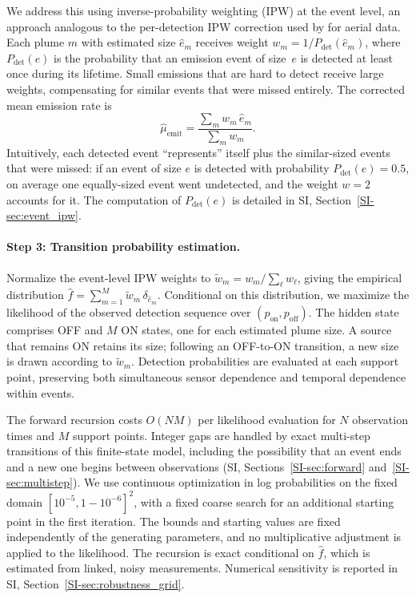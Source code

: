 \documentclass[numsec,webpdf,modern,mediumone]{oup-authoring-template}
\newcommand{\new}[1]{#1}
\begin{document}
We address this using inverse-probability weighting (IPW) at the event level, \new{an approach analogous to the per-detection IPW correction used by \citet{Sherwin2024Nature} for aerial data}. Each plume $m$ with estimated size $\hat{e}_m$ receives weight $w_m = 1/P_{\text{det}}(\hat{e}_m)$, where $P_{\text{det}}(e)$ is the probability that an emission event of size~$e$ is detected at least once during its lifetime. Small emissions that are hard to detect receive large weights, compensating for similar events that were missed entirely. The corrected mean emission rate is
\begin{equation}
    \hat{\mu}_{\text{emit}}
    = \frac{\sum_m w_m \,\hat{e}_m}{\sum_m w_m}.
    \label{eq:ipw}
\end{equation}
Intuitively, each detected event ``represents'' itself plus the similar-sized events that were missed: if an event of size $e$ is detected with probability $P_{\text{det}}(e) = 0.5$, on average one equally-sized event went undetected, and the weight $w = 2$ accounts for it. The computation of $P_{\text{det}}(e)$ is detailed in SI, Section~\ref{SI-sec:event_ipw}.

\paragraph{Step 3: Transition probability estimation.}
Normalize the event-level IPW weights to $\tilde w_m=w_m/\sum_\ell w_\ell$, giving the empirical distribution $\hat f=\sum_{m=1}^{M}\tilde w_m\,\delta_{\hat e_m}$. Conditional on this distribution, we maximize the likelihood of the observed detection sequence over $(p_{\text{on}},p_{\text{off}})$. The hidden state comprises OFF and $M$ ON states, one for each estimated plume size. A source that remains ON retains its size; following an OFF-to-ON transition, a new size is drawn according to $\tilde w_m$. Detection probabilities are evaluated at each support point, preserving both simultaneous sensor dependence and temporal dependence within events.

The forward recursion costs $O(NM)$ per likelihood evaluation for $N$ observation times and $M$ support points. Integer gaps are handled by exact multi-step transitions of this finite-state model, including the possibility that an event ends and a new one begins between observations (SI, Sections~\ref{SI-sec:forward} and~\ref{SI-sec:multistep}). We use continuous optimization in log probabilities on the fixed domain $[10^{-5},1-10^{-6}]^2$, with a fixed coarse search for an additional starting point in the first iteration. The bounds and starting values are fixed independently of the generating parameters, and no multiplicative adjustment is applied to the likelihood. The recursion is exact conditional on $\hat f$, which is estimated from linked, noisy measurements. Numerical sensitivity is reported in SI, Section~\ref{SI-sec:robustness_grid}.
\end{document}

